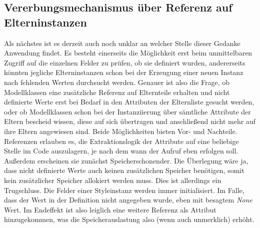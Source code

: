 \subsection{Vererbungsmechanismus über Referenz auf Elterninstanzen}
Als nächstes ist es derzeit auch noch unklar an welcher Stelle dieser Gedanke Anwendung findet. Es besteht einerseits die Möglichkeit erst beim unmittelbaren Zugriff auf die einzelnen Felder zu prüfen, ob sie definiert wurden, andererseits könnten jegliche Elterninstanzen schon bei der Erzeugung einer neuen Instanz nach fehlenden Werten durchsucht werden. Genauer ist also die Frage, ob Modellklassen eine zusätzliche Referenz auf Elternteile erhalten und nicht definierte Werte erst bei Bedarf in den Attributen der Elternliste gesucht werden, oder ob Modellklassen schon bei der Instanziierung über sämtliche Attribute der Eltern bescheid wissen, diese auf sich übertragen und anschließend nicht mehr auf ihre Eltern angewiesen sind. Beide Möglichkeiten bieten Vor- und Nachteile. Referenzen erlauben es, die Extraktionslogik der Attribute auf eine beliebige Stelle im Code auszulagern, je nach dem wann der Aufruf eben erfolgen soll. Außerdem erscheinen sie zunächst Speicherschonender. Die Überlegung wäre ja, dass nicht definierte Werte auch keinen zusätzlichen Speicher benötigen, somit kein zusätzlicher Speicher allokiert werden muss. Dies ist allerdings ein Trugschluss. Die Felder einer Styleinstanz werden immer initialisiert. Im Falle, dass der Wert in der Definition nicht angegeben wurde, eben mit besagtem \textit{None} Wert. Im Endeffekt ist also leiglich eine weitere Referenz als Attribut hinzugekommen, was die Speicherauslastung also (wenn auch unmerklich) erhöht.
